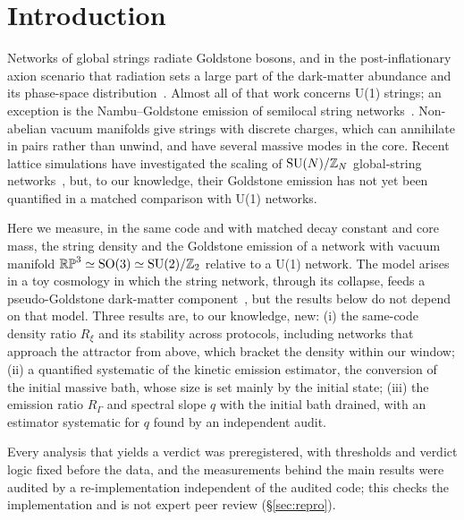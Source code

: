 \documentclass[prd,twocolumn,superscriptaddress,nofootinbib,amsmath,amssymb]{revtex4-2}
\newcommand{\RP}{\mathbb{RP}^3}
\newcommand{\Ztwo}{\mathbb{Z}_2}
\newcommand{\RG}{R_\Gamma}
\newcommand{\Rxi}{R_\xi}
\begin{document}
\maketitle

\section{Introduction}

Networks of global strings radiate Goldstone bosons, and in the post-inflationary axion scenario that radiation sets a large part of the dark-matter abundance and its phase-space distribution~\cite{GHV2018,GHV2021,Buschmann2022,Hindmarsh2021approach,Saikawa2024,KimParkSon2024,Correia2025spectrum}.
Almost all of that work concerns U(1) strings; an exception is the Nambu--Goldstone emission of semilocal string networks~\cite{KandaKitajima2025}.
Non-abelian vacuum manifolds give strings with discrete charges, which can annihilate in pairs rather than unwind, and have several massive modes in the core.
Recent lattice simulations have investigated the scaling of ${\rm SU}(N)/\mathbb{Z}_N$ global-string networks~\cite{Yamada2026}, but, to our knowledge, their Goldstone emission has not yet been quantified in a matched comparison with U(1) networks.

Here we measure, in the same code and with matched decay constant and core mass, the string density and the Goldstone emission of a network with vacuum manifold $\RP\simeq{\rm SO}(3)\simeq{\rm SU}(2)/\Ztwo$ relative to a U(1) network.
The model arises in a toy cosmology in which the string network, through its collapse, feeds a pseudo-Goldstone dark-matter component~\cite{whalefall_repo}, but the results below do not depend on that model.
Three results are, to our knowledge, new:
(i) the same-code density ratio $\Rxi$ and its stability across protocols, including networks that approach the attractor from above, which bracket the density within our window;
(ii) a quantified systematic of the kinetic emission estimator, the conversion of the initial massive bath, whose size is set mainly by the initial state;
(iii) the emission ratio $\RG$ and spectral slope $q$ with the initial bath drained, with an estimator systematic for $q$ found by an independent audit.

Every analysis that yields a verdict was preregistered, with thresholds and verdict logic fixed before the data, and the measurements behind the main results were audited by a re-implementation independent of the audited code; this checks the implementation and is not expert peer review (\S\ref{sec:repro}).
\end{document}
